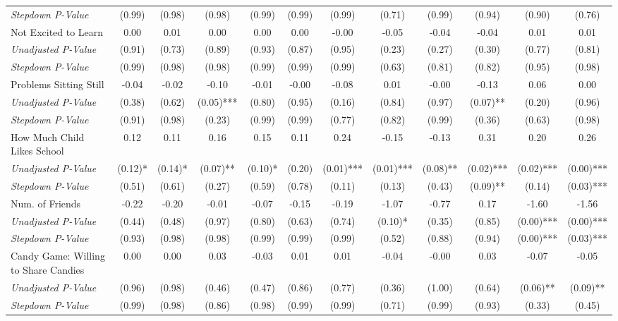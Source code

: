 \begin{tabular}{l c c c c c c c c c c c}
\quad \textit{Stepdown P-Value} & (0.99) & (0.98) & (0.98) & (0.99) & (0.99) & (0.99) & (0.71) & (0.99) & (0.94) & (0.90) & (0.76) \\
Not Excited to Learn & 0.00 & 0.01 & 0.00 & 0.00 & 0.00 & -0.00 & -0.05 & -0.04 & -0.04 & 0.01 & 0.01 \\
\quad \textit{Unadjusted P-Value} & (0.91) & (0.73) & (0.89) & (0.93) & (0.87) & (0.95) & (0.23) & (0.27) & (0.30) & (0.77) & (0.81) \\
\quad \textit{Stepdown P-Value} & (0.99) & (0.98) & (0.98) & (0.99) & (0.99) & (0.99) & (0.63) & (0.81) & (0.82) & (0.95) & (0.98) \\
Problems Sitting Still & -0.04 & -0.02 & -0.10 & -0.01 & -0.00 & -0.08 & 0.01 & -0.00 & -0.13 & 0.06 & 0.00 \\
\quad \textit{Unadjusted P-Value} & (0.38) & (0.62) & (0.05)*** & (0.80) & (0.95) & (0.16) & (0.84) & (0.97) & (0.07)** & (0.20) & (0.96) \\
\quad \textit{Stepdown P-Value} & (0.91) & (0.98) & (0.23) & (0.99) & (0.99) & (0.77) & (0.82) & (0.99) & (0.36) & (0.63) & (0.98) \\
How Much Child Likes School & 0.12 & 0.11 & 0.16 & 0.15 & 0.11 & 0.24 & -0.15 & -0.13 & 0.31 & 0.20 & 0.26 \\
\quad \textit{Unadjusted P-Value} & (0.12)* & (0.14)* & (0.07)** & (0.10)* & (0.20) & (0.01)*** & (0.01)*** & (0.08)** & (0.02)*** & (0.02)*** & (0.00)*** \\
\quad \textit{Stepdown P-Value} & (0.51) & (0.61) & (0.27) & (0.59) & (0.78) & (0.11) & (0.13) & (0.43) & (0.09)** & (0.14) & (0.03)*** \\
Num. of Friends & -0.22 & -0.20 & -0.01 & -0.07 & -0.15 & -0.19 & -1.07 & -0.77 & 0.17 & -1.60 & -1.56 \\
\quad \textit{Unadjusted P-Value} & (0.44) & (0.48) & (0.97) & (0.80) & (0.63) & (0.74) & (0.10)* & (0.35) & (0.85) & (0.00)*** & (0.00)*** \\
\quad \textit{Stepdown P-Value} & (0.93) & (0.98) & (0.98) & (0.99) & (0.99) & (0.99) & (0.52) & (0.88) & (0.94) & (0.00)*** & (0.03)*** \\
Candy Game: Willing to Share Candies & 0.00 & 0.00 & 0.03 & -0.03 & 0.01 & 0.01 & -0.04 & -0.00 & 0.03 & -0.07 & -0.05 \\
\quad \textit{Unadjusted P-Value} & (0.96) & (0.98) & (0.46) & (0.47) & (0.86) & (0.77) & (0.36) & (1.00) & (0.64) & (0.06)** & (0.09)** \\
\quad \textit{Stepdown P-Value} & (0.99) & (0.98) & (0.86) & (0.98) & (0.99) & (0.99) & (0.71) & (0.99) & (0.93) & (0.33) & (0.45) \\
\bottomrule
\end{tabular}
